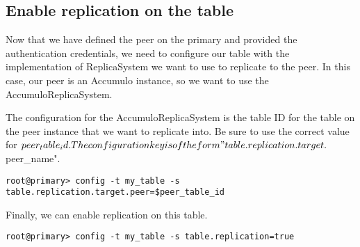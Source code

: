 \subsection{Enable replication on the table}

Now that we have defined the peer on the primary and provided the authentication credentials, we need to configure
our table with the implementation of ReplicaSystem we want to use to replicate to the peer. In this case, our peer 
is an Accumulo instance, so we want to use the AccumuloReplicaSystem.

The configuration for the AccumuloReplicaSystem is the table ID for the table on the peer instance that we
want to replicate into. Be sure to use the correct value for $peer_table_id. The configuration key is of
the form "table.replication.target.$peer_name".

\begingroup\fontsize{8pt}{8pt}\selectfont\begin{verbatim}
root@primary> config -t my_table -s table.replication.target.peer=$peer_table_id
\end{verbatim}\endgroup

Finally, we can enable replication on this table.

\begingroup\fontsize{8pt}{8pt}\selectfont\begin{verbatim}
root@primary> config -t my_table -s table.replication=true
\end{verbatim}\endgroup

